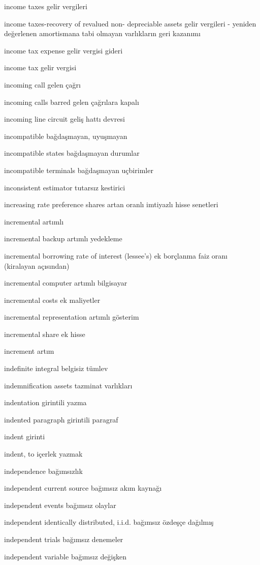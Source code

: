 \documentclass[12pt,fleqn]{article}\usepackage{../../common}
\begin{document}
income taxes gelir vergileri

income taxes-recovery of revalued non- depreciable assets gelir vergileri - yeniden değerlenen amortismana tabi olmayan varlıkların geri kazanımı

income tax expense gelir vergisi gideri

income tax gelir vergisi

incoming call gelen çağrı

incoming calls barred gelen çağrılara kapalı

incoming line circuit geliş hattı devresi

incompatible bağdaşmayan, uyuşmayan

incompatible states bağdaşmayan durumlar

incompatible terminals bağdaşmayan uçbirimler

inconsistent estimator tutarsız kestirici

increasing rate preference shares artan oranlı imtiyazlı hisse senetleri

incremental artımlı

incremental backup artımlı yedekleme

incremental borrowing rate of interest (lessee's) ek borçlanma faiz oranı (kiralayan açısından)

incremental computer artımlı bilgisayar

incremental costs ek maliyetler

incremental representation artımlı gösterim

incremental share ek hisse

increment artım

indefinite integral belgisiz tümlev

indemnification assets tazminat varlıkları

indentation girintili yazma

indented paragraph girintili paragraf

indent girinti

indent, to içerlek yazmak

independence bağımsızlık

independent current source bağımsız akım kaynağı

independent events bağımsız olaylar

independent identically distributed, i.i.d. bağımsız özdeşçe dağılmış

independent trials bağımsız denemeler

independent variable bağımsız değişken
\end{document}
